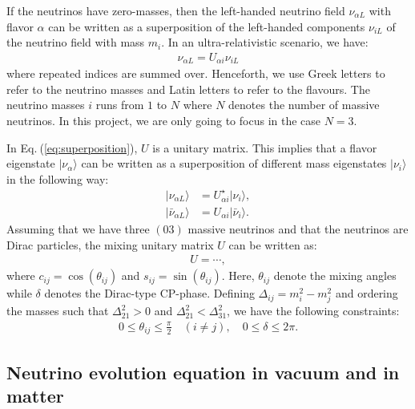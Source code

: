 \documentclass[twocolumn,secnumarabic,amssymb, nobibnotes, aps, prd,10pt]{revtex4-1}
\newcommand{\kt}[1]{\vert #1 \rangle}
\newcommand{\Eq}[1]{Eq.$\:$(\ref{#1})}
\begin{document}
If the neutrinos have zero-masses, then the left-handed neutrino field $\nu_{\alpha L}$
with flavor $\alpha$ can be written as a superposition of the left-handed components
$\nu_{iL}$ of the neutrino field with mass $m_i$. In an ultra-relativistic scenario, we
have:
\begin{align}
\nu_{\alpha L} = U_{\alpha i} \nu_{i L}
\label{eq:superposition}
\end{align} 
where repeated indices are summed over. Henceforth, we use Greek letters to refer to
the neutrino masses and Latin letters to refer to the flavours. The neutrino masses
$i$ runs from $1$ to $N$ where $N$ denotes the number of massive neutrinos. In this
project, we are only going to focus in the case $N=3$.

In \Eq{eq:superposition}, $U$ is a unitary matrix. This implies that a flavor eigenstate
$\kt{\nu_\alpha}$ can be written as a superposition of different mass eigenstates $\kt{\nu_i}$
in the following way:
\begin{align}
\kt{\nu_{\alpha L}} &= U^\star_{\alpha i} \kt{\nu_i}, \\
\kt{\bar{\nu}_{\alpha L}} &= U_{\alpha i} \kt{\bar{\nu}_i}.
\end{align}
Assuming that we have three $(03)$ massive neutrinos and that the neutrinos are Dirac
particles, the mixing unitary matrix $U$ can be written as:
\begin{align}
U = \cdots ,
\label{eq:evolution_matrix}
\end{align}
where $c_{ij} = \cos(\theta_{ij})$ and $s_{ij} = \sin(\theta_{ij})$. Here, $\theta_{ij}$
denote the mixing angles while $\delta$ denotes the Dirac-type CP-phase. Defining 
$\Delta_{ij} = m_i^2 - m_j^2$ and ordering the masses such that $\Delta_{21}^2 > 0$
and $\Delta_{21}^2 < \Delta_{31}^2$, we have the following constraints:
\begin{align}
0 \leq \theta_{ij} \leq \frac{\pi}{2} \quad (i \neq j), \quad 0 \leq \delta \leq 2 \pi .
\end{align}


\subsection{Neutrino evolution equation in vacuum and in matter}
\label{subsec:evoleq}
\end{document}

